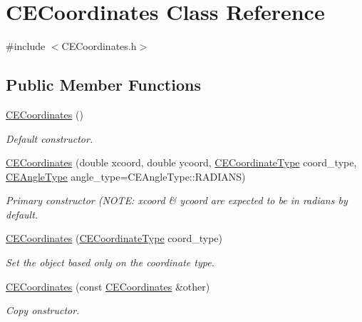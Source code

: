 \hypertarget{class_c_e_coordinates}{}\section{C\+E\+Coordinates Class Reference}
\label{class_c_e_coordinates}


{\ttfamily \#include $<$C\+E\+Coordinates.\+h$>$}

\subsection*{Public Member Functions}
\begin{DoxyCompactItemize}
\item 
\hyperlink{class_c_e_coordinates_adbaa5893da76e77dca4d1b8e630132d4}{C\+E\+Coordinates} ()
\begin{DoxyCompactList}\small\item\em Default constructor. \end{DoxyCompactList}\item 
\hyperlink{class_c_e_coordinates_ad98944b414371e55e8e5d13b3475ddb0}{C\+E\+Coordinates} (double xcoord, double ycoord, \hyperlink{_c_e_coordinates_8h_a2198dc50406b64707964f5c1e8b32db2}{C\+E\+Coordinate\+Type} coord\+\_\+type, \hyperlink{namespace_cpp_ephem_a9a974f6ccf329e8cb5f9208b725f15ef}{C\+E\+Angle\+Type} angle\+\_\+type=C\+E\+Angle\+Type\+::\+R\+A\+D\+I\+A\+N\+S)
\begin{DoxyCompactList}\small\item\em Primary constructor (N\+O\+T\+E\+: xcoord \& ycoord are expected to be in radians by default. \end{DoxyCompactList}\item 
\hyperlink{class_c_e_coordinates_a1c51863ec6e2e6f38c9e9b42fcea323d}{C\+E\+Coordinates} (\hyperlink{_c_e_coordinates_8h_a2198dc50406b64707964f5c1e8b32db2}{C\+E\+Coordinate\+Type} coord\+\_\+type)
\begin{DoxyCompactList}\small\item\em Set the object based only on the coordinate type. \end{DoxyCompactList}\item 
\hyperlink{class_c_e_coordinates_a12be549e1747131f766bcc9c67e8fe4f}{C\+E\+Coordinates} (const \hyperlink{class_c_e_coordinates}{C\+E\+Coordinates} \&other)
\begin{DoxyCompactList}\small\item\em Copy onstructor. \end{DoxyCompactList}\item 

\end{DoxyCompactItemize}
